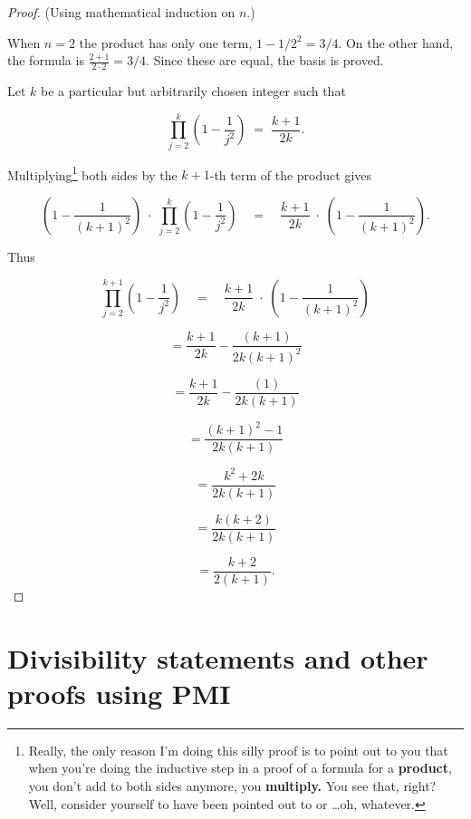 \begin{proof}
(Using mathematical induction on $n$.)

 When $n = 2$ the product has only one term, $1-1/2^2 = 3/4$.
On the other hand, the formula is 
$\displaystyle \frac{2+1}{2\cdot2} = 3/4$.  Since these are equal, the 
basis is proved.


Let $k$ be a particular but arbitrarily chosen integer such that

\[ \prod_{j=2}^k \left( 1 - \frac{1}{j^2} \right) \;  = \; \frac{k+1}{2k}. \]

Multiplying\footnote{Really, the only reason I'm doing this silly proof is to 
point out to you that when you're doing the inductive step in a proof of a 
formula for a {\bf product}, you don't add to both sides anymore, you {\bf multiply.} You see that, right?  Well, consider yourself to have been pointed out to or \ldots oh, whatever.}  both sides by the $k+1$-th term of the product 
gives

\[ \left( 1 - \frac{1}{(k+1)^2} \right) \; \cdot \; \prod_{j=2}^k \left( 1 - \frac{1}{j^2} \right) \quad  = \quad \frac{k+1}{2k} \; \cdot \; \left( 1 - \frac{1}{(k+1)^2} \right). \]

Thus 

\[ \prod_{j=2}^{k+1} \left( 1 - \frac{1}{j^2} \right) \quad  = \quad \frac{k+1}{2k} \; \cdot \; \left( 1 - \frac{1}{(k+1)^2} \right) \]

\[ = \frac{k+1}{2k} - \frac{(k+1)}{2k(k+1)^2} \]

\[ = \frac{k+1}{2k} - \frac{(1)}{2k(k+1)} \]

\[ = \frac{(k+1)^2 - 1}{2k(k+1)} \]

\[ = \frac{k^2+2k}{2k(k+1)} \]

\[ = \frac{k (k+2)}{2k(k+1)} \]

\[ = \frac{k+2}{2(k+1)}. \]

\end{proof}

\newpage
  


 
\newpage

\section[Other proofs using PMI]{Divisibility statements and other proofs using PMI}

